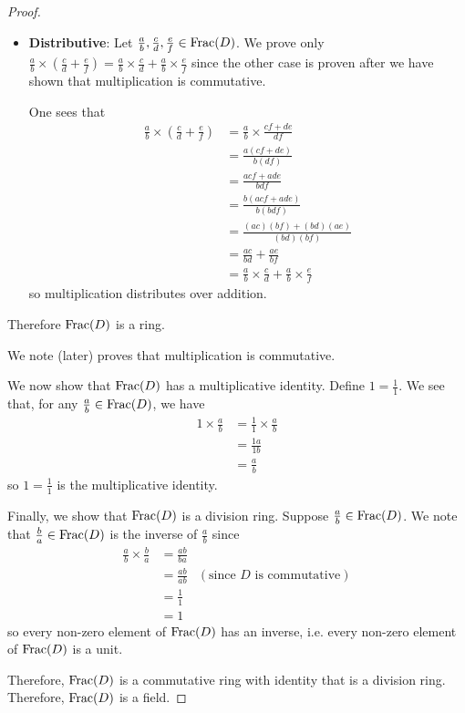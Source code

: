 \begin{proof}
\begin{itemize}
        \item \textbf{Distributive}: Let $\frac ab, \frac cd, \frac ef \in \mathrm{Frac}(D)$. We prove only $\frac ab \times \left(\frac cd + \frac ef\right) = \frac ab \times \frac cd + \frac ab \times \frac ef$ since the other case is proven after we have shown that multiplication is commutative.
        
        One sees that
        \begin{align*}
            \frac ab \times \left(\frac cd + \frac ef\right) &= \frac ab \times \frac{cf + de}{df}\\
            &= \frac{a(cf + de)}{b(df)}\\
            &= \frac{acf + ade}{bdf}\\
            &= \frac{b(acf + ade)}{b(bdf)}\\
            &= \frac{(ac)(bf) + (bd)(ae)}{(bd)(bf)}\\
            &= \frac{ac}{bd} + \frac {ae}{bf}\\
            &= \frac ab \times \frac cd + \frac ab \times \frac ef
        \end{align*}
        so multiplication distributes over addition.
    \end{itemize}
    Therefore $\mathrm{Frac}(D)$ is a ring. 
    
    We note  (later) proves that multiplication is commutative.

    We now show that $\mathrm{Frac}(D)$ has a multiplicative identity. Define $1 = \frac 11$. We see that, for any $\frac ab \in \mathrm{Frac}(D)$, we have
    \begin{align*}
        1 \times \frac ab &= \frac 11 \times \frac ab\\
        &= \frac {1a}{1b}\\
        &= \frac ab
    \end{align*}
    so $1 = \frac 11$ is the multiplicative identity.

    Finally, we show that $\mathrm{Frac}(D)$ is a division ring. Suppose $\frac ab \in \mathrm{Frac}(D)$. We note that $\frac ba \in \mathrm{Frac}(D)$ is the inverse of $\frac ab$ since
    \begin{align*}
        \frac ab \times \frac ba &= \frac{ab}{ba}\\
        &= \frac{ab}{ab} & (\text{since } D \text{ is commutative})\\
        &= \frac11\\
        &= 1
    \end{align*}
    so every non-zero element of $\mathrm{Frac}(D)$ has an inverse, i.e. every non-zero element of $\mathrm{Frac}(D)$ is a unit.

    Therefore, $\mathrm{Frac}(D)$ is a commutative ring with identity that is a division ring. Therefore, $\mathrm{Frac}(D)$ is a field.
\end{proof}

